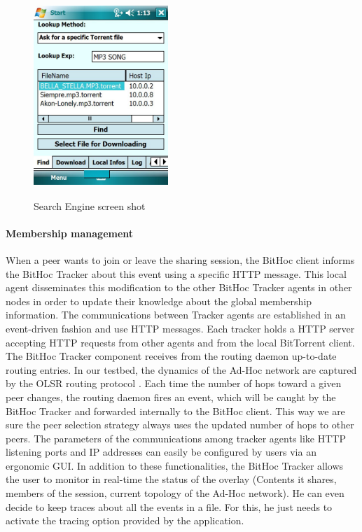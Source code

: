 \begin{figure}[!h]
  \begin{center}
    \includegraphics[width=2in,height=3in]{Chapitre2/searchengine.png}
  \end{center}
  \caption{Search Engine screen shot}
  \label{Figsearchengine}
\end{figure}

\paragraph{Membership management}

When a peer wants to join or leave the sharing session, the BitHoc client informs the BitHoc Tracker about this event using a specific HTTP message. This local agent disseminates this modification to the other BitHoc Tracker agents in other nodes in order to update their knowledge about the global membership information. The communications between Tracker agents are established in an event-driven fashion and use HTTP messages. Each tracker holds a HTTP server accepting HTTP requests from other agents and from the local BitTorrent client. The BitHoc Tracker component receives from the routing daemon up-to-date routing entries. In our testbed, the dynamics of the Ad-Hoc network are captured by the OLSR routing protocol \cite{OLSR}. Each time the number of hops toward a given peer changes, the routing daemon fires an event, which will be caught by the BitHoc Tracker and forwarded internally to the BitHoc client. This way we are sure the peer selection strategy always uses the updated number of hops to other peers. The parameters of the communications among tracker agents like HTTP listening ports and IP addresses can easily be configured by users via an ergonomic GUI. In addition to these functionalities, the BitHoc Tracker allows the user to monitor in real-time the status of the overlay (Contents it shares, members of the session, current topology of the Ad-Hoc network). He can even decide to keep traces about all the events in a file. For this, he just needs to activate the tracing option provided by the application.

